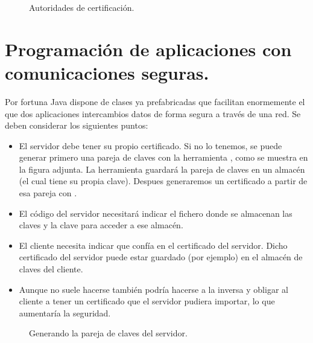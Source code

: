 \documentclass[letterpaper,10pt,spanish]{sphinxmanual}
\begin{document}
\begin{figure}[htbp]
\centering
\capstart

\noindent{}
\caption{Autoridades de certificación.}\label{\detokenize{textos/tema5:id1}}\end{figure}


\section{Programación de aplicaciones con comunicaciones seguras.}
\label{\detokenize{textos/tema5:programacion-de-aplicaciones-con-comunicaciones-seguras}}
Por fortuna Java dispone de clases ya prefabricadas que facilitan enormemente el que dos aplicaciones intercambios datos de forma segura a través de una red. Se deben considerar los siguientes puntos:
\begin{itemize}
\item {} 
El servidor debe tener su propio certificado. Si no lo tenemos, se puede generar primero una pareja de claves con la herramienta , como se muestra en la figura adjunta. La herramienta guardará la pareja de claves en un almacén (el cual tiene su propia clave). Despues generaremos un certificado a partir de esa pareja con .

\item {} 
El código del servidor necesitará indicar el fichero donde se almacenan las claves y la clave para acceder a ese almacén.

\item {} 
El cliente necesita indicar que confía en el certificado del servidor. Dicho certificado del servidor puede estar guardado (por ejemplo) en el almacén de claves del cliente.

\item {} 
Aunque no suele hacerse también podría hacerse a la inversa y obligar al cliente a tener un certificado que el servidor pudiera importar, lo que aumentaría la seguridad.

\end{itemize}

\begin{figure}[htbp]
\centering
\capstart

\noindent{}
\caption{Generando la pareja de claves del servidor.}\label{\detokenize{textos/tema5:id2}}\end{figure}
\end{document}
